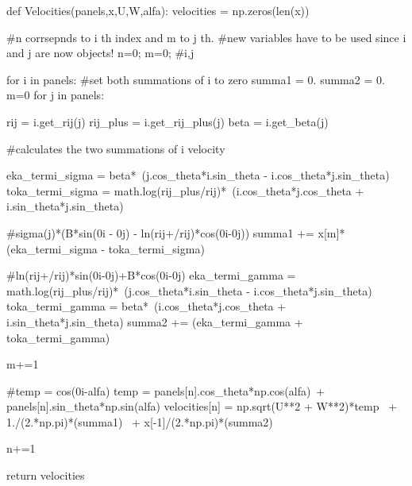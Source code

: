\documentclass[a4paper,12pt]{article}
\begin{document}
\begin{python}
def Velocities(panels,x,U,W,alfa):       
        velocities = np.zeros(len(x))

        #n corrsepnds to i th index and m to j th.
        #new variables have to be used since i and j are now objects!
        n=0; m=0; #i,j
       
        for i in panels:
                #set both summations of i to zero
                summa1 = 0.
                summa2 = 0.
                m=0
                for j in panels:
                                      
                                 
                        rij = i.get_rij(j)
                        rij_plus = i.get_rij_plus(j)
                        beta = i.get_beta(j)                  

                        #calculates the two summations of i velocity        
                        
                        eka_termi_sigma = beta*\
                         (j.cos_theta*i.sin_theta - i.cos_theta*j.sin_theta)
                        toka_termi_sigma = math.log(rij_plus/rij)*\
                            (i.cos_theta*j.cos_theta + i.sin_theta*j.sin_theta)

                         #sigma(j)*(B*sin(0i - 0j) - ln(rij+/rij)*cos(0i-0j))
                        summa1 += x[m]*(eka_termi_sigma - toka_termi_sigma)


                                        #ln(rij+/rij)*sin(0i-0j)+B*cos(0i-0j)
                        eka_termi_gamma = math.log(rij_plus/rij)*\
                       (j.cos_theta*i.sin_theta - i.cos_theta*j.sin_theta)
                        toka_termi_gamma = beta*\
                           (i.cos_theta*j.cos_theta + i.sin_theta*j.sin_theta)
                        summa2 += (eka_termi_gamma + toka_termi_gamma)                        

                        m+=1                                                  

                #temp = cos(0i-alfa)
                temp = panels[n].cos_theta*np.cos(alfa)\
                     + panels[n].sin_theta*np.sin(alfa)
                velocities[n] = np.sqrt(U**2 + W**2)*temp \
                                + 1./(2.*np.pi)*(summa1) \
                                + x[-1]/(2.*np.pi)*(summa2)
                                             
                
                n+=1
                                   
        return velocities
\end{python}
\end{document}
